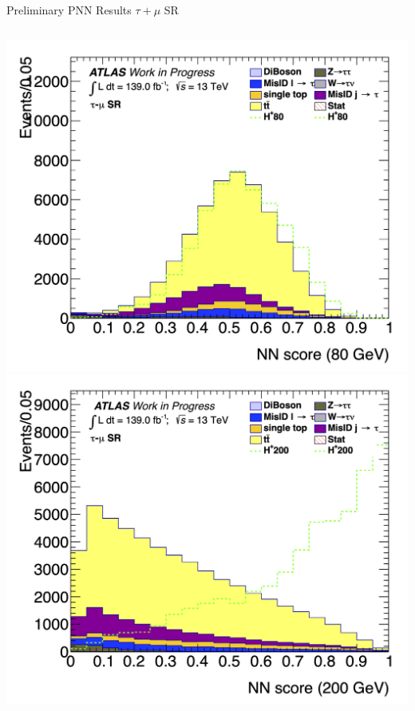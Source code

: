 \documentclass[aspectratio=169,xcolor=table]{beamer}
\begin{document}
    \begin{frame}[t]{Preliminary PNN Results $\tau+\mu$ SR}
      \begin{columns}[t]
        \includegraphics[height=.43\textheight,keepaspectratio=true]{Scores/taulep/myOutDirClfEval_1p_noUpsilon_test_full/clf_score_GB200_mass_80to80_SR_TAUMU.png}
        \includegraphics[height=.43\textheight,keepaspectratio=true]{Scores/taulep/myOutDirClfEval_1p_noUpsilon_test_full/clf_score_GB200_mass_200to200_SR_TAUMU.png}


\end{columns}
\end{frame}
\end{document}
